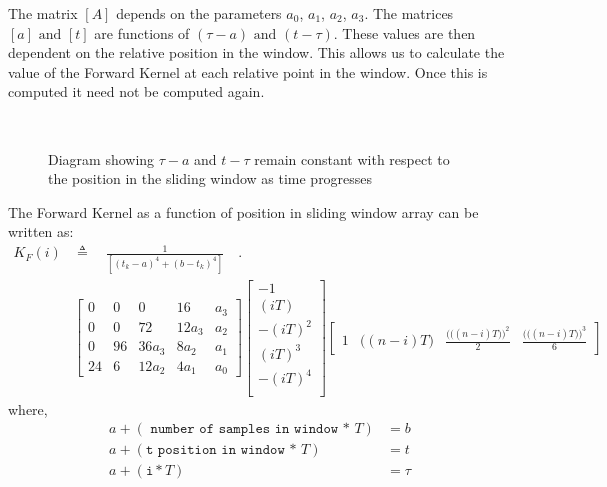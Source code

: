 \documentclass[letterpaper%
, twoside%
, 12pt%
,memoire%
, english%
,creativecommons,hyperref%
]{thETS}
\begin{document}
The matrix $[A]$ depends on the parameters $a_0$, $a_1$, $a_2$, $a_3$. The matrices $[a] \textrm{ and } [t]$ are functions of $(\tau-a) \textrm{ and } (t-\tau)$. These values are then dependent on the relative position in the window. This allows us to calculate the value of the Forward Kernel at each relative point in the window. Once this is computed it need not be computed again. 

\begin{figure}[H]
	\centering
	\resizebox{0.85\textwidth}{!}{\fbox{}}
	 \\ \parbox{0.75\textwidth}{\caption{Diagram showing $\tau -a$ and $t-\tau$ remain constant with respect to the position in the sliding window as time progresses \label{sliding_array}}}
\end{figure}

The Forward Kernel as a function of position in sliding window array can be written as:
\begin{align}
K_{F}(i)  &\triangleq \quad \frac{1}{[(t_k-a)^4+(b-t_k)^4]} \quad .\nonumber\\
&\begin{bmatrix}
0  &  0  &   0   &  16    &   a_3   \\
0  &  0  &   72   & 12a_3  &   a_2  \\
0  &  96 & 36a_3 &  8a_2  &   a_1   \\
24 &  6  & 12a_2 &  4a_1   &   a_0  
\end{bmatrix}
\begin{bmatrix}
  -1     \\
 (iT)    \\
-(iT)^2  \\
 (iT)^3  \\
-(iT)^4  \\
\end{bmatrix}
\begin{bmatrix}
1  & \big((n-i)T\big) & \frac{\Big(\big((n-i)T\big)\Big)^2}{2} & \frac{\Big(\big((n-i)T\big)\Big)^3}{6}
\end{bmatrix}
\label{Kfi}
\end{align}
where,
\begin{subequations}
\begin{align}
a+ (\texttt{ number of samples in window * } T)&= b \\ 
a+ (\texttt{t position in window * } T) &= t \\
a+ (\texttt{i}*T) &= \tau
\end{align}
\end{subequations}
\end{document}
